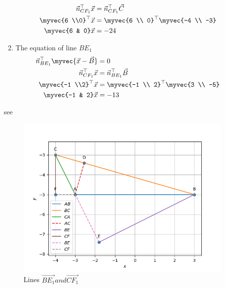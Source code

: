 \documentclass[11pt]{book}
\begin{document}
\begin{enumerate}[label=\thesection.\arabic*.,ref=\thesection.\theenumi]
\begin{enumerate}
\begin{align}
          \vec{n}^{\top}_{CF_1}\vec{x}&= \vec{n}^{\top}_{CF_1}\vec{C} \\
          \myvec{6 \\0}^{\top}\vec{x}&=\myvec{6 \\ 0}^{\top}\myvec{-4 \\ -3}\\
          \myvec{6 & 0}\vec{x}&=-24
      \end{align}
      \item The equation of line $BE_1$
      \begin{align}
          \vec{n}^{\top}_{BE_1}\myvec{\vec{x}-\vec{B}}&=0 \\
          \vec{n}^{\top}_{CF_1}\vec{x}&= \vec{n}^{\top}_{BE_1}\vec{B} \\
          \myvec{-1 \\2}^{\top}\vec{x}&=\myvec{-1 \\ 2}^{\top}\myvec{3 \\ -5}\\
          \myvec{-1 & 2}\vec{x}&=-13
      \end{align}
  \end{enumerate}
  see 
  \begin{figure}[H]
      \centering
      \includegraphics{figs/line_be_cf.png}
      \caption{Lines $\vec{BE_1} and \vec{CF_1}$}
      \label{fig:line_BE1_CF1}
  \end{figure}
  


\end{enumerate}
\end{document}
